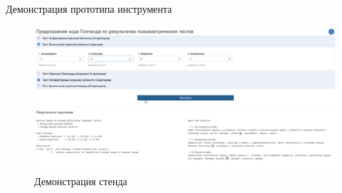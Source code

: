 \documentclass[english,russian, 10pt]{beamer}
\begin{document}
    


\begin{frame}{Демонстрация прототипа инструмента}
    \begin{figure}
        \centering
        \includegraphics[width=0.95\linewidth]{images/UI1.png}
        \caption{Демонстрация стенда}
        \label{fig:ui1}
    \end{figure}
\end{frame}
\end{document}
